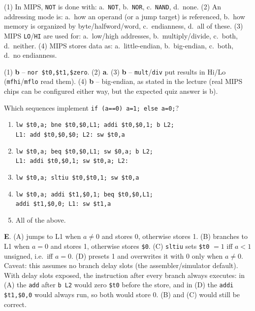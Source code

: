\begin{exercise}
(1) In MIPS, \texttt{NOT} is done with: a.\ \texttt{NOT}, b.\ \texttt{NOR},
c.\ \texttt{NAND}, d.\ none.
(2) An addressing mode is: a.\ how an operand (or a jump target) is
referenced, b.\ how memory is organized by byte/halfword/word, c.\
endianness, d.\ all of these.
(3) MIPS \texttt{LO}/\texttt{HI} are used for: a.\ low/high addresses, b.\
multiply/divide, c.\ both, d.\ neither.
(4) MIPS stores data as: a.\ little-endian, b.\ big-endian, c.\ both, d.\
no endianness.
\end{exercise}
\begin{solution}
(1) \textbf{b} -- \texttt{nor \$t0,\$t1,\$zero}.
(2) \textbf{a}.
(3) \textbf{b} -- \texttt{mult}/\texttt{div} put results in Hi/Lo
(\texttt{mfhi}/\texttt{mflo} read them).
(4) \textbf{b} -- big-endian, as stated in the lecture (real MIPS chips can
be configured either way, but the expected quiz answer is b).
\end{solution}

\begin{exercise}[C to MIPS]
Which sequences implement \texttt{if (a==0) a=1; else a=0;}?
\begin{enumerate}[label=(\Alph*),leftmargin=*]
  \item \texttt{lw \$t0,a; bne \$t0,\$0,L1; addi \$t0,\$0,1; b L2;}\\
        \texttt{L1: add \$t0,\$0,\$0; L2: sw \$t0,a}
  \item \texttt{lw \$t0,a; beq \$t0,\$0,L1; sw \$0,a; b L2;}\\
        \texttt{L1: addi \$t0,\$0,1; sw \$t0,a; L2:}
  \item \texttt{lw \$t0,a; sltiu \$t0,\$t0,1; sw \$t0,a}
  \item \texttt{lw \$t0,a; addi \$t1,\$0,1; beq \$t0,\$0,L1;}\\
        \texttt{addi \$t1,\$0,0; L1: sw \$t1,a}
  \item All of the above.
\end{enumerate}
\end{exercise}
\begin{solution}
\textbf{E}. (A) jumps to L1 when $a\neq0$ and stores 0, otherwise stores 1.
(B) branches to L1 when $a=0$ and stores 1, otherwise stores \texttt{\$0}.
(C) \texttt{sltiu} sets \texttt{\$t0} $=1$ iff $a<1$ unsigned, i.e.\ iff
$a=0$. (D) presets 1 and overwrites it with 0 only when $a\neq0$.
Caveat: this assumes no branch delay slots (the assembler/simulator
default). With delay slots exposed, the instruction after every branch
always executes: in (A) the \texttt{add} after \texttt{b L2} would zero
\texttt{\$t0} before the store, and in (D) the \texttt{addi \$t1,\$0,0}
would always run, so both would store 0. (B) and (C) would still be
correct.
\end{solution}

